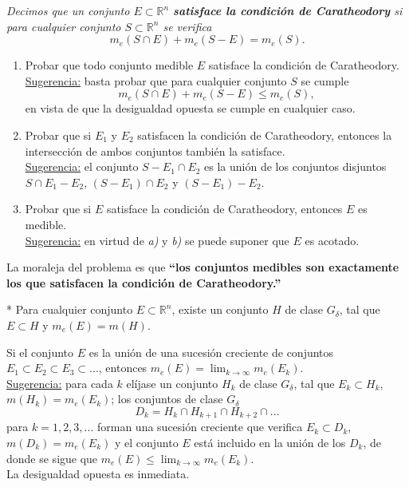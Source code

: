 \documentclass{book}
\newcommand{\rr}{\mathbb{R}}
\newcommand{\di}{\displaystyle}
\begin{document}
  \begin{ejer} {} 
	{\it{Decimos que un conjunto $E\subset \rr^n$ 
  {\bf{satisface la condición de Caratheodory}}
  si para cualquier conjunto $S\subset \rr^n$ se verifica}} 
  $$m_e(S\cap E)+m_e(S-E)=m_e(S). $$
	\begin{enumerate}   
    \item Probar que todo conjunto medible $E$ satisface la condición de Caratheodory.
    \\
    \underline{Sugerencia:} basta probar que para cualquier conjunto $S$ se cumple
    $$m_e(S\cap E)+m_e(S-E)\leq m_e(S), $$
    en vista de que la desigualdad opuesta se cumple en cualquier caso.
 
    \item Probar que si $E_1$ y $E_2$ satisfacen la condición de Caratheodory, 
    entonces la intersección de ambos conjuntos también la satisface.
    \\
    \underline{Sugerencia:} el conjunto $S-E_1\cap E_2$ es la unión de los conjuntos 
    disjuntos $S\cap E_1-E_2$, $(S-E_1)\cap E_2$ y $(S-E_1)-E_2$.

    \item Probar que si $E$ satisface la condición de Caratheodory, entonces $E$ es medible.
    \\
    \underline{Sugerencia:} en virtud de {\it{a)}} y {\it{b)}} se puede suponer que $E$ es acotado.
	\end{enumerate}
    La moraleja del problema es que 
    {\bf{``los conjuntos medibles son exactamente los que satisfacen
    la condición de Caratheodory.''}}
  \end{ejer} 
	
	
  \begin{ejer}{}*
	\label{ej-guia}
  Para cualquier conjunto $E \subset \rr^n$, existe un conjunto $H$ de clase $G_{\delta}$,
  tal que $E \subset H$ y $m_e(E)=m(H)$.
	\end{ejer} 

  \begin{ejer} {}
  Si el conjunto $E$ es la unión de una sucesión creciente de conjuntos 
  $E_1\subset E_2\subset E_3\subset...$, entonces 
  $ m_e(E)=\di\lim_{k\rightarrow \infty} m_e(E_k).$
  \\
  \underline{Sugerencia:} para cada $k$ elíjase un conjunto $H_k$ de clase $G_{\delta}$,
  tal que $E_k\subset H_k$, $m(H_k)=m_e(E_k)$; los conjuntos de clase $G_{\delta}$
  $$D_k=H_k\cap H_{k+1}\cap H_{k+2}\cap... $$
  para $k=1,2,3,...$ forman una sucesión creciente que verifica $E_k \subset D_k$,
  $m(D_k)=m_e(E_k)$ y el conjunto $E$ está incluido en la unión de los $D_k$, de donde
  se sigue que $m_e(E)\leq \di\lim_{k\rightarrow \infty} m_e(E_k)$.
  \\
  La desigualdad opuesta es inmediata.
 \end{ejer}
\end{document}
